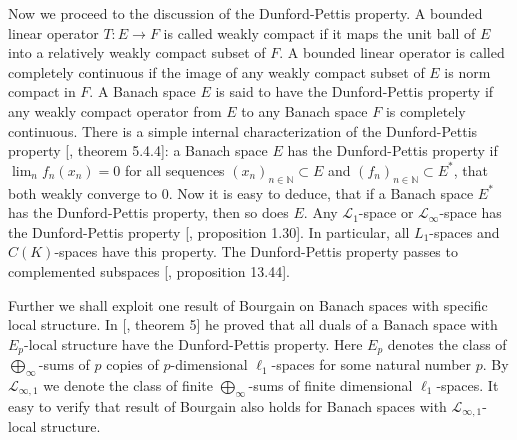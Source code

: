 \documentclass[12pt]{article}
\begin{document}
Now we proceed to the discussion of the Dunford-Pettis property. A bounded linear operator $T:E\to F$ is called weakly compact if it maps the unit ball of $E$ into a relatively weakly compact subset of $F$. A bounded linear operator is called completely continuous if the image of any weakly compact subset of $E$ is norm compact in $F$. A Banach space $E$ is said to have the Dunford-Pettis property if any weakly compact operator from $E$ to any Banach space $F$ is completely continuous. There is a simple internal characterization of the Dunford-Pettis property [\cite{KalAlbTopicsBanSpTh}, theorem 5.4.4]: a Banach space $E$ has the Dunford-Pettis property if $\lim_n f_n(x_n)=0$ for all sequences $(x_n)_{n\in\mathbb{N}}\subset E$ and $(f_n)_{n\in\mathbb{N}}\subset E^*$, that both weakly converge to $0$. Now it is easy to deduce, that if a Banach space $E^*$ has the Dunford-Pettis property, then so does $E$.  Any $\mathscr{L}_1$-space or $\mathscr{L}_\infty$-space has the Dunford-Pettis property [\cite{BourgNewClOfLpSp}, proposition 1.30]. In particular, all $L_1$-spaces and $C(K)$-spaces have this property. The Dunford-Pettis property passes to complemented subspaces [\cite{FabHabBanSpTh}, proposition 13.44]. 

Further we shall exploit one result of Bourgain on Banach spaces with specific local structure. In [\cite{BourgOnTheDPP}, theorem 5] he proved that all duals of a Banach space with $E_p$-local structure have the Dunford-Pettis property. Here $E_p$ denotes the class of  $\bigoplus_\infty$-sums of $p$ copies of $p$-dimensional $\ell_1$-spaces for some natural number $p$. By $\mathcal{L}_{\infty,1}$ we denote the class of finite $\bigoplus_\infty$-sums of finite dimensional $\ell_1$-spaces. It easy to verify that result of Bourgain also holds for Banach spaces with $\mathcal{L}_{\infty,1}$-local structure.
\end{document}
